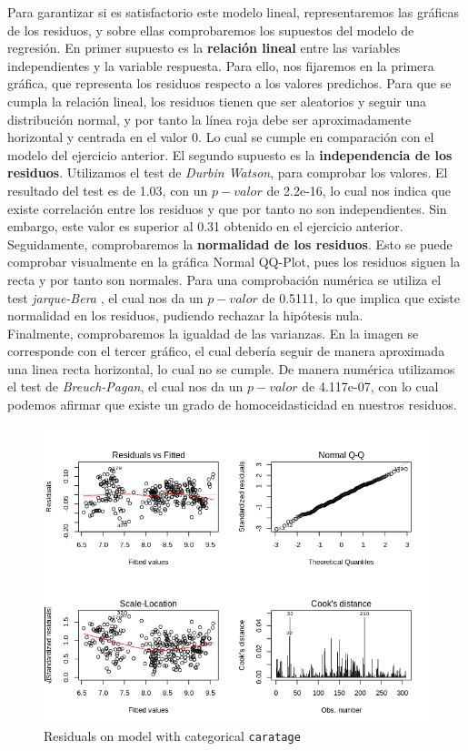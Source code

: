 \documentclass[a4paper, 7pt]{article}
\begin{document}
Para garantizar si es satisfactorio este modelo lineal, representaremos las gráficas de los residuos, y sobre ellas comprobaremos los supuestos del modelo de regresión. En primer supuesto es la \textbf{relación lineal} entre las variables independientes y la variable respuesta. Para ello, nos fijaremos en la primera gráfica, que representa los residuos respecto a los valores predichos. Para que se cumpla la relación lineal, los residuos tienen que ser aleatorios y seguir una distribución normal, y por tanto la línea roja debe ser aproximadamente horizontal y centrada en el valor 0. Lo cual se cumple en comparación con el modelo del ejercicio anterior. El segundo supuesto es la \textbf{independencia de los residuos}. Utilizamos el test de \textit{Durbin Watson}, para comprobar los valores. El resultado del test es de 1.03, con un $p-valor$ de 2.2e-16, lo cual nos indica que existe correlación entre los residuos y que por tanto no son independientes. Sin embargo, este valor es superior al 0.31 obtenido en el ejercicio anterior. Seguidamente, comprobaremos la \textbf{normalidad de los residuos}. Esto se puede comprobar visualmente en la gráfica Normal QQ-Plot, pues los residuos siguen la recta y por tanto son normales. Para una comprobación numérica se utiliza el test \textit{jarque-Bera} \cite{jarquebera}, el cual nos da un $p-valor$ de 0.5111, lo que implica que existe normalidad en los residuos, pudiendo rechazar la hipótesis nula. \\

Finalmente, comprobaremos la igualdad de las varianzas. En la imagen se corresponde con el tercer gráfico, el cual debería seguir de manera aproximada una linea recta horizontal, lo cual no se cumple. De manera numérica utilizamos el test de \textit{Breuch-Pagan}, el cual nos da un $p-valor$ de 4.117e-07, con lo cual podemos afirmar que existe un grado de homoceidasticidad en nuestros residuos.

\begin{figure}[h!]
    \centering
    \includegraphics[scale=0.5]{report/images/question-3/question-1.png}
    \caption{Residuals on model with categorical \texttt{caratage}}
    \label{fig:my_label}
\end{figure}
\end{document}
